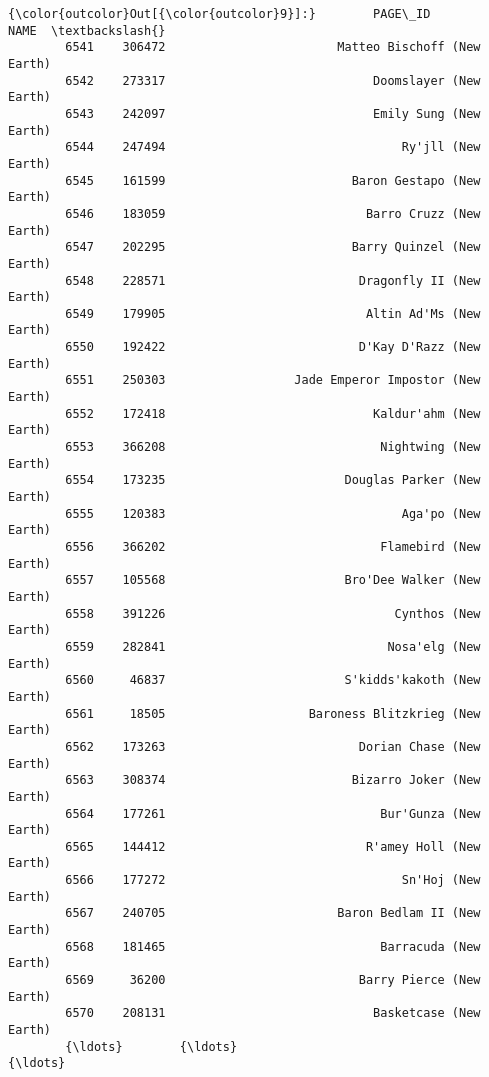\documentclass[11pt]{article}
\begin{document}
\begin{Verbatim}[commandchars=\\\{\}]
{\color{outcolor}Out[{\color{outcolor}9}]:}        PAGE\_ID                                               NAME  \textbackslash{}
        6541    306472                        Matteo Bischoff (New Earth)   
        6542    273317                             Doomslayer (New Earth)   
        6543    242097                             Emily Sung (New Earth)   
        6544    247494                                 Ry'jll (New Earth)   
        6545    161599                          Baron Gestapo (New Earth)   
        6546    183059                            Barro Cruzz (New Earth)   
        6547    202295                          Barry Quinzel (New Earth)   
        6548    228571                           Dragonfly II (New Earth)   
        6549    179905                            Altin Ad'Ms (New Earth)   
        6550    192422                           D'Kay D'Razz (New Earth)   
        6551    250303                  Jade Emperor Impostor (New Earth)   
        6552    172418                             Kaldur'ahm (New Earth)   
        6553    366208                              Nightwing (New Earth)   
        6554    173235                         Douglas Parker (New Earth)   
        6555    120383                                 Aga'po (New Earth)   
        6556    366202                              Flamebird (New Earth)   
        6557    105568                         Bro'Dee Walker (New Earth)   
        6558    391226                                Cynthos (New Earth)   
        6559    282841                               Nosa'elg (New Earth)   
        6560     46837                         S'kidds'kakoth (New Earth)   
        6561     18505                    Baroness Blitzkrieg (New Earth)   
        6562    173263                           Dorian Chase (New Earth)   
        6563    308374                          Bizarro Joker (New Earth)   
        6564    177261                              Bur'Gunza (New Earth)   
        6565    144412                            R'amey Holl (New Earth)   
        6566    177272                                 Sn'Hoj (New Earth)   
        6567    240705                        Baron Bedlam II (New Earth)   
        6568    181465                              Barracuda (New Earth)   
        6569     36200                           Barry Pierce (New Earth)   
        6570    208131                             Basketcase (New Earth)   
        {\ldots}        {\ldots}                                                {\ldots}   

\end{Verbatim}
\end{document}

